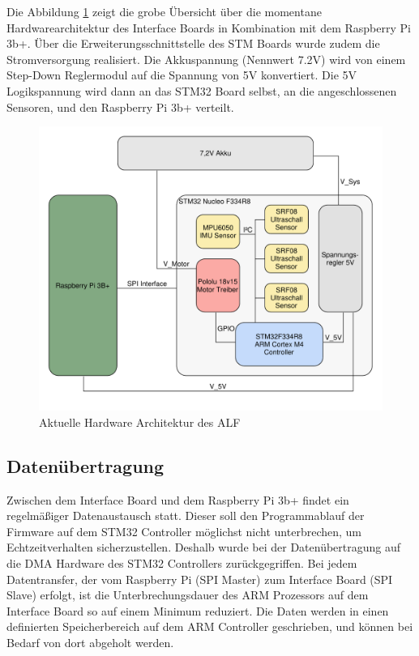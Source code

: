 Die Abbildung \ref{fig:IfBoardHWUebersicht} zeigt die grobe Übersicht über die momentane Hardwarearchitektur des Interface Boards in Kombination mit dem Raspberry Pi 3b+. Über die Erweiterungsschnittstelle des STM Boards wurde zudem die Stromversorgung realisiert. Die Akkuspannung (Nennwert 7.2V) wird von einem Step-Down Reglermodul auf die Spannung von 5V konvertiert. Die 5V Logikspannung wird dann an das STM32 Board selbst, an die angeschlossenen Sensoren, und den Raspberry Pi 3b+ verteilt.

\begin{figure}[hbtp]
\centering
\includegraphics[scale=0.5]{images/chapter4/HW-Architecture.pdf}
\caption{Aktuelle Hardware Architektur des ALF \label{fig:IfBoardHWUebersicht}}
\end{figure}

\subsection{Datenübertragung}

Zwischen dem Interface Board und dem Raspberry Pi 3b+ findet ein regelmäßiger Datenaustausch statt. Dieser soll den Programmablauf der Firmware auf dem STM32 Controller möglichst nicht unterbrechen, um Echtzeitverhalten sicherzustellen. Deshalb wurde bei der Datenübertragung auf die DMA Hardware des STM32 Controllers zurückgegriffen. Bei jedem Datentransfer, der vom Raspberry Pi (SPI Master) zum Interface Board (SPI Slave) erfolgt, ist die Unterbrechungsdauer des ARM Prozessors auf dem Interface Board so auf einem Minimum reduziert. Die Daten werden in einen definierten Speicherbereich auf dem ARM Controller geschrieben, und können bei Bedarf von dort abgeholt werden.






